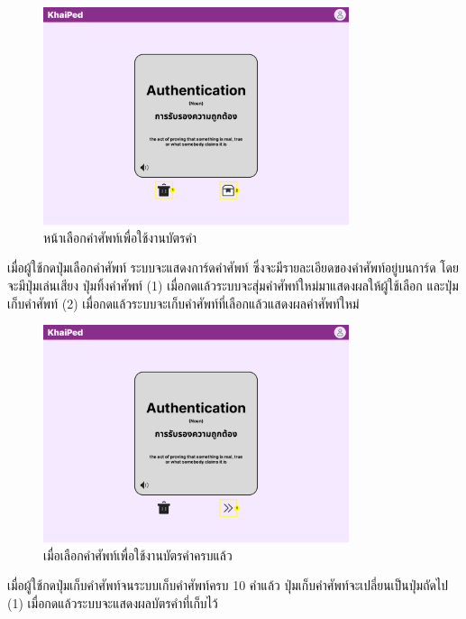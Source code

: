 \documentclass[12pt,oneside,openright,a4paper]{cpe-thai-project}
\begin{document}
\begin{figure}[!h]\centering
	\includegraphics[width=0.8\textwidth, keepaspectratio=true]{image/chap3/ui/flashcard/Flashcard - Select Word.png}
	\caption{หน้าเลือกคำศัพท์เพื่อใช้งานบัตรคำ}\label{fig:UI_SelectFlashcard1}
\end{figure}
\hspace{1cm}
เมื่อผู้ใช้กดปุ่มเลือกคำศัพท์ ระบบจะแสดงการ์ดคำศัพท์ ซึ่งจะมีรายละเอียดของคำศัพท์อยู่บนการ์ด โดยจะมีปุ่มเล่นเสียง ปุ่มทิ้งคำศัพท์ (1)
เมื่อกดแล้วระบบจะสุ่มคำศัพท์ใหม่มาแสดงผลให้ผู้ใช้เลือก และปุ่มเก็บคำศัพท์ (2) เมื่อกดแล้วระบบจะเก็บคำศัพท์ที่เลือกแล้วแสดงผลคำศัพท์ใหม่

\pagebreak
\begin{figure}[!h]\centering
	\includegraphics[width=0.8\textwidth, keepaspectratio=true]{image/chap3/ui/flashcard/Flashcard - Select Word-1.png}
	\caption{เมื่อเลือกคำศัพท์เพื่อใช้งานบัตรคำครบแล้ว}\label{fig:UI_SelectFlashcard2}
\end{figure}
\hspace{1cm}
เมื่อผู้ใช้กดปุ่มเก็บคำศัพท์จนระบบเก็บคำศัพท์ครบ 10 คำแล้ว ปุ่มเก็บคำศัพท์จะเปลี่ยนเป็นปุ่มถัดไป (1) เมื่อกดแล้วระบบจะแสดงผลบัตรคำที่เก็บไว้
\end{document}
